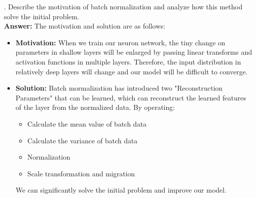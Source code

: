 \documentclass{article}
\begin{document}
. Describe the motivation of batch normalization and analyze how this method solve the initial problem. \\ 

\textbf{Answer: } The motivation and solution are as follows:

\begin{itemize}
    \item \textbf{Motivation:} When we train our neuron network, the tiny change on parameters in shallow layers will be enlarged by passing linear transforms and activation functions in multiple layers. Therefore, the input distribution in relatively deep layers will change and our model will be difficult to converge.
    
    \item \textbf{Solution:} Batch mormalization has introduced two "Reconstruction Parameters" that can be learned, which can reconstruct the learned features of the layer from the normalized data. By operating:
    
    \begin{itemize}
        \item Calculate the mean value of batch data
        
        \item Calculate the variance of batch data
        
        \item Normalization
        
        \item Scale transformation and migration
    \end{itemize}
    
    We can significantly solve the initial problem and improve our model.
    
\end{itemize}
\end{document}
